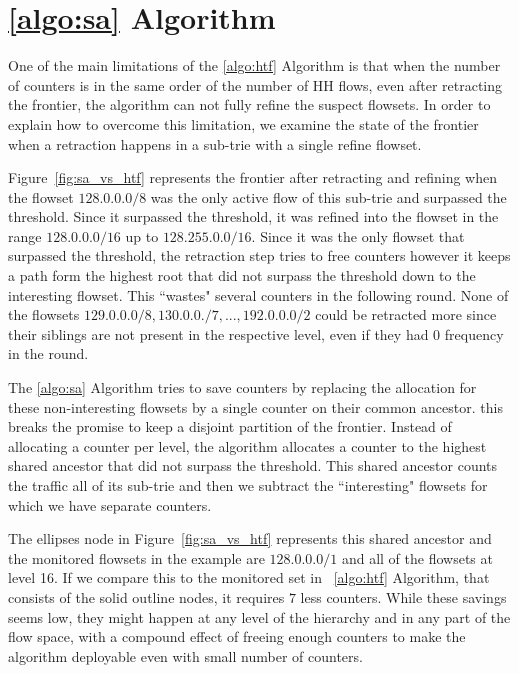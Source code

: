 \section{\ref{algo:sa} Algorithm}

One of the main limitations of the \ref{algo:htf} Algorithm is that when the number of counters is in the same order of the number of HH flows, even after retracting the frontier, the algorithm can not fully refine the suspect flowsets. In order to explain how to overcome this limitation, we examine the state of the frontier when a retraction happens in a sub-trie with a single refine flowset.

Figure~\ref{fig:sa_vs_htf} represents the frontier after retracting and refining when the flowset $128.0.0.0/8$ was the only active flow of this sub-trie and surpassed the threshold. Since it surpassed the threshold,  it was refined into the flowset in the range $128.0.0.0/16$ up to $128.255.0.0/16$. Since it was the only flowset that surpassed the threshold, the retraction step tries to free counters however it keeps a path form the highest root that did not surpass the threshold down to the interesting flowset. This ``wastes" several counters in the following round. None of the flowsets $129.0.0.0/8, 130.0.0./7, ..., 192.0.0.0/2$ could be retracted more since their siblings are not present in the respective level, even if they had 0 frequency in the round.

The \ref{algo:sa} Algorithm tries to save counters by replacing the allocation for these non-interesting flowsets by a single counter on their common ancestor.  this breaks the promise to keep a disjoint partition of the frontier. Instead of allocating a counter per level, the algorithm allocates a counter to the highest shared ancestor that did not surpass the threshold. This shared ancestor  counts the traffic all of its sub-trie and then we subtract  the ``interesting" flowsets for which we have separate counters.

The ellipses node in Figure~\ref{fig:sa_vs_htf} represents this shared ancestor and the monitored flowsets in the example are $128.0.0.0/1$ and all of the flowsets at level 16. If we compare this to the monitored set in ~\ref{algo:htf} Algorithm, that consists of the solid outline nodes, it requires $7$ less counters. While these savings seems low, they might happen at any level of the hierarchy and in any part of the flow space, with a compound effect of freeing enough counters to make the algorithm deployable even with small number of counters.

